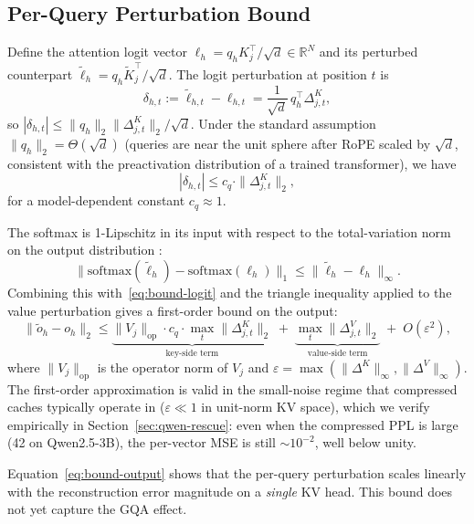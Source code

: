 \subsection{Per-Query Perturbation Bound}
\label{sec:theory-perquery}

Define the attention logit vector $\ell_h = q_h K_j^\top / \sqrt{d}
\in \mathbb{R}^N$ and its perturbed counterpart $\tilde \ell_h =
q_h \tilde K_j^\top / \sqrt{d}$. The logit perturbation at position $t$ is
\begin{equation}
\label{eq:delta-logit}
\delta_{h,t} := \tilde \ell_{h,t} - \ell_{h,t} = \frac{1}{\sqrt{d}}\, q_h^\top \Delta^K_{j,t},
\end{equation}
so $|\delta_{h,t}| \le \|q_h\|_2 \|\Delta^K_{j,t}\|_2 / \sqrt{d}$. Under the
standard assumption $\|q_h\|_2 = \Theta(\sqrt{d})$ (queries are near the unit
sphere after RoPE scaled by $\sqrt{d}$, consistent with the preactivation
distribution of a trained transformer), we have
\begin{equation}
\label{eq:bound-logit}
|\delta_{h,t}| \le c_q \cdot \|\Delta^K_{j,t}\|_2,
\end{equation}
for a model-dependent constant $c_q \approx 1$.

The softmax is 1-Lipschitz in its input with respect to the total-variation
norm on the output distribution \cite{gao2017properties}:
\[
\|\mathrm{softmax}(\tilde \ell_h) - \mathrm{softmax}(\ell_h)\|_1
\le \|\tilde \ell_h - \ell_h\|_\infty.
\]
Combining this with~\eqref{eq:bound-logit} and the triangle inequality applied
to the value perturbation gives a first-order bound on the output:
\begin{equation}
\label{eq:bound-output}
\|\tilde o_h - o_h\|_2
\le \underbrace{\|V_j\|_{\mathrm{op}} \cdot c_q \cdot \max_t \|\Delta^K_{j,t}\|_2}_{\text{key-side term}}
\; + \;
\underbrace{\max_t \|\Delta^V_{j,t}\|_2}_{\text{value-side term}}
\; + \; O(\varepsilon^2),
\end{equation}
where $\|V_j\|_{\mathrm{op}}$ is the operator norm of $V_j$ and
$\varepsilon = \max(\|\Delta^K\|_\infty, \|\Delta^V\|_\infty)$.
The first-order approximation is valid in the small-noise regime that
compressed caches typically operate in ($\varepsilon \ll 1$ in unit-norm KV
space), which we verify empirically in Section~\ref{sec:qwen-rescue}: even
when the compressed PPL is large (42 on Qwen2.5-3B), the per-vector MSE is
still $\sim 10^{-2}$, well below unity.

Equation~\eqref{eq:bound-output} shows that the per-query perturbation scales
linearly with the reconstruction error magnitude on a \emph{single} KV head.
This bound does not yet capture the GQA effect.


